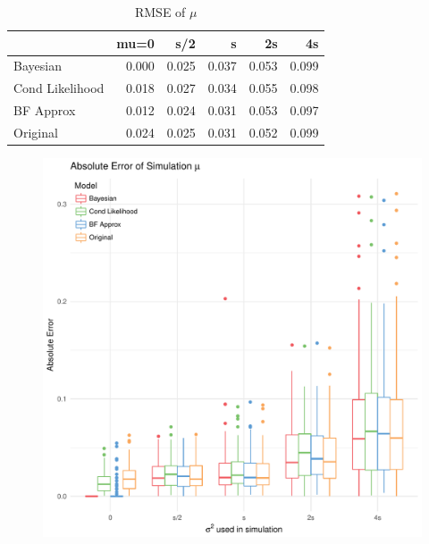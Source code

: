 \documentclass[AMA,STIX1COL]{WileyNJD-v2}\usepackage[]{graphicx}\usepackage[]{color}
\makeatletter
\def\maxwidth{ %
  \ifdim\Gin@nat@width>\linewidth
    \linewidth
  \else
    \Gin@nat@width
  \fi
}
\newenvironment{knitrout}{}{} %
\makeatother
\begin{document}
\begin{knitrout}
\color{fgcolor}\begin{table}

\caption{\label{tab:unnamed-chunk-25}RMSE of $\mu$}
\centering
\begin{tabular}[t]{l|r|r|r|r|r}
\hline
  & mu=0 & s/2 & s & 2s & 4s\\
\hline
Bayesian & 0.000 & 0.025 & 0.037 & 0.053 & 0.099\\
\hline
Cond Likelihood & 0.018 & 0.027 & 0.034 & 0.055 & 0.098\\
\hline
BF Approx & 0.012 & 0.024 & 0.031 & 0.053 & 0.097\\
\hline
Original & 0.024 & 0.025 & 0.031 & 0.052 & 0.099\\
\hline
\end{tabular}
\end{table}


\end{knitrout}


\begin{figure}
\begin{knitrout}
\color{fgcolor}
\includegraphics[width=\maxwidth]{figure/unnamed-chunk-26-1} 

\end{knitrout}
\end{figure}
\end{document}
